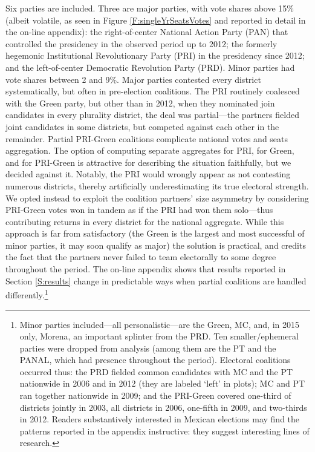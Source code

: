 \documentclass[letter,12pt]{article}
\begin{document}
{Six parties are included. Three are major parties, with vote shares above 15\% (albeit volatile, as seen in Figure \ref{F:singleYrSeatsVotes} and reported in detail in the on-line appendix): the right-of-center National Action Party (PAN) that controlled the presidency in the observed period up to 2012; the formerly hegemonic Institutional Revolutionary Party (PRI) in the presidency since 2012; and the left-of-center Democratic Revolution Party (PRD). Minor parties had vote shares between 2 and 9\%. Major parties contested every district systematically, but often in pre-election coalitions. The PRI routinely coalesced with the Green party, but other than in 2012, when they nominated join candidates in every plurality district, the deal was partial---the partners fielded joint candidates in some districts, but competed against each other in the remainder. Partial PRI-Green coalitions complicate national votes and seats aggregation. The option of computing separate aggregates for PRI, for Green, and for PRI-Green is attractive for describing the situation faithfully, but we decided against it. Notably, the PRI would wrongly appear as not contesting numerous districts, thereby artificially underestimating its true electoral strength. We opted instead to exploit the coalition partners' size asymmetry by considering PRI-Green votes won in tandem as if the PRI had won them solo---thus contributing returns in every district for the national aggregate. While this approach is far from satisfactory (the Green is the largest and most successful of minor parties, it may soon qualify as major) the solution is practical, and credits the fact that the partners never failed to team electorally to some degree throughout the period. The on-line appendix shows that results reported in Section \ref{S:results} change in predictable ways when partial coalitions are handled differently.\footnote{Minor parties included---all personalistic---are the Green, MC, and, in 2015 only, Morena, an important splinter from the PRD. Ten smaller/ephemeral parties were dropped from analysis (among them are the PT and the PANAL, which had presence throughout the period). Electoral coalitions occurred thus: the PRD fielded common candidates with MC and the PT nationwide in 2006 and in 2012 (they are labeled `left' in plots); MC and PT ran together nationwide in 2009; and the PRI-Green covered one-third of districts jointly in 2003, all districts in 2006, one-fifth in 2009, and two-thirds in 2012. Readers substantively interested in Mexican elections may find the patterns reported in the appendix instructive: they suggest interesting lines of research.} 

}
\end{document}
